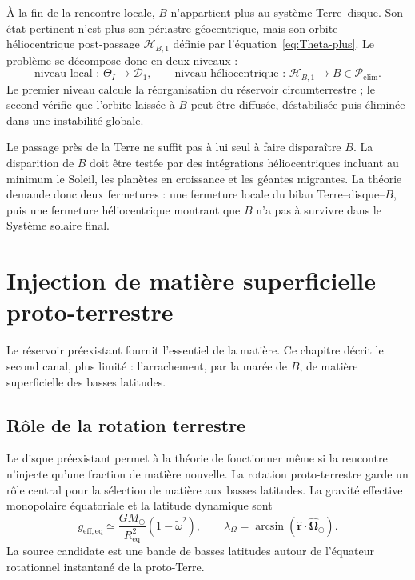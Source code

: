 \documentclass[11pt,a4paper,openany]{report}
\newcommand{\Mt}{M_{\oplus}}
\newcommand{\Req}{R_{\mathrm{eq}}}
\begin{document}
À la fin de la rencontre locale, $B$ n'appartient plus au système Terre--disque. Son état pertinent
n'est plus son périastre géocentrique, mais son orbite héliocentrique post-passage
$\mathcal{H}_{B,1}$ définie par l'équation~\eqref{eq:Theta-plus}. Le problème se décompose donc en
deux niveaux :
\begin{equation}
\boxed{\;\text{niveau local : } \Theta_I\to\mathcal{D}_1,
\qquad
\text{niveau héliocentrique : } \mathcal{H}_{B,1}\to B\in\mathcal{P}_{\mathrm{elim}}.\;}
\label{eq:deux-niveaux-B}
\end{equation}
Le premier niveau calcule la réorganisation du réservoir circumterrestre ; le second vérifie que
l'orbite laissée à $B$ peut être diffusée, déstabilisée puis éliminée dans une instabilité globale.

\begin{controle}
Le passage près de la Terre ne suffit pas à lui seul à faire disparaître $B$. La disparition de $B$
doit être testée par des intégrations héliocentriques incluant au minimum le Soleil, les planètes en
croissance et les géantes migrantes. La théorie demande donc deux fermetures : une fermeture
locale du bilan Terre--disque--$B$, puis une fermeture héliocentrique montrant que $B$ n'a pas à
survivre dans le Système solaire final.
\end{controle}


\chapter{Injection de matière superficielle proto-terrestre}
\label{ch:injection}

Le réservoir préexistant fournit l'essentiel de la matière. Ce chapitre décrit le second canal, plus
limité : l'arrachement, par la marée de $B$, de matière superficielle des basses latitudes.

\section{Rôle de la rotation terrestre}

Le disque préexistant permet à la théorie de fonctionner même si la rencontre n'injecte qu'une
fraction de matière nouvelle. La rotation proto-terrestre garde un rôle central pour la sélection
de matière aux basses latitudes. La gravité effective monopolaire équatoriale et la latitude
dynamique sont
\begin{equation}
g_{\mathrm{eff,eq}}\simeq\frac{G\Mt}{\Req^2}\left(1-\tilde\omega^2\right),
\qquad
\lambda_\Omega=\arcsin\!\left(\hat{\mathbf{r}}\cdot\hat{\boldsymbol{\Omega}}_\oplus\right).
\label{eq:geff}
\end{equation}
La source candidate est une bande de basses latitudes autour de l'équateur rotationnel
instantané de la proto-Terre.
\end{document}
